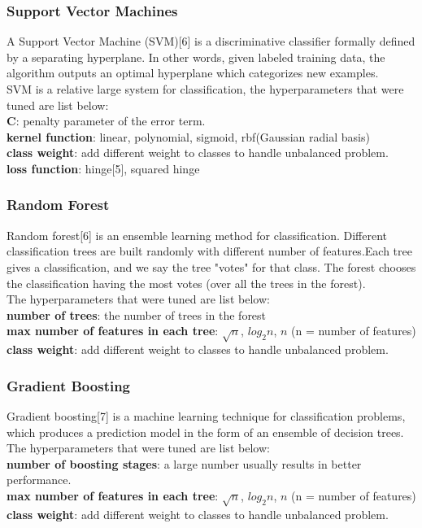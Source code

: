 \documentclass{article}
\begin{document}
\subsubsection{Support Vector Machines}
A Support Vector Machine (SVM)[6] is a discriminative classifier formally defined by a separating hyperplane. In other words, given labeled training data, the algorithm outputs an optimal hyperplane which categorizes new examples. \\

SVM is a relative large system for classification, the hyperparameters that were tuned are list below:\\
\textbf{C}: penalty parameter of the error term. \\
\textbf{kernel function}: linear, polynomial, sigmoid, rbf(Gaussian radial basis)\\
\textbf{class weight}: add different weight to classes to handle unbalanced problem.\\
\textbf{loss function}: hinge[5], squared hinge

\subsubsection{Random Forest}
Random forest[6] is an ensemble learning method for classification. Different classification trees are built randomly with different number of features.Each tree gives a classification, and we say the tree "votes" for that class. The forest chooses the classification having the most votes (over all the trees in the forest). \\

The hyperparameters that were tuned are list below:\\
\textbf{number of trees}: the number of trees in the forest\\
\textbf{max number of features in each tree}: $\sqrt{n}$, $log_2{n}$, $n$ (n = number of features)\\
\textbf{class weight}: add different weight to classes to handle unbalanced problem.

\subsubsection{Gradient Boosting}
Gradient boosting[7] is a machine learning technique for classification problems, which produces a prediction model in the form of an ensemble of decision trees.\\

The hyperparameters that were tuned are list below:\\
\textbf{number of boosting stages}: a large number usually results in better performance.\\
\textbf{max number of features in each tree}: $\sqrt{n}$, $log_2{n}$, $n$ (n = number of features)\\
\textbf{class weight}: add different weight to classes to handle unbalanced problem.
\end{document}
